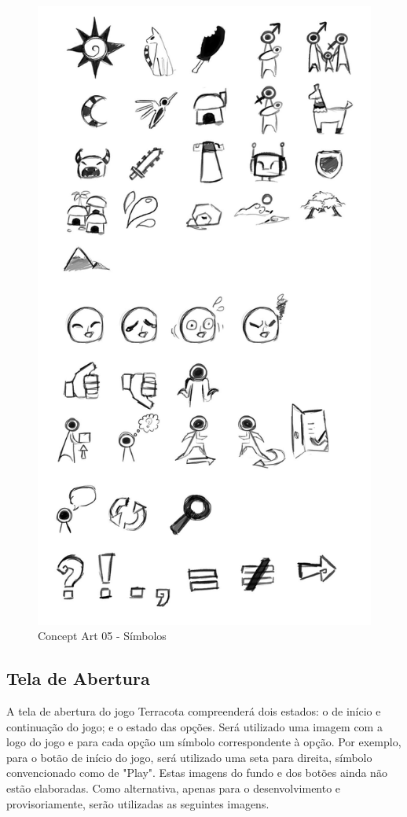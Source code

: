 \documentclass[12pt]{article}
\begin{document}
\begin{figure}[hp]
    \centering
    \includegraphics[scale=0.16]{concept_art_05.jpg}
    \caption{Concept Art 05 - Símbolos}
    \label{fig:concept_art_05}
\end{figure}

\newpage
\subsection{Tela de Abertura}
A tela de abertura do jogo Terracota compreenderá dois estados: o de início e
continuação do jogo; e o estado das opções. Será utilizado uma imagem com a
logo do jogo e para cada opção um símbolo correspondente à opção. Por exemplo,
para o botão de início do jogo, será utilizado uma seta para direita, símbolo
convencionado como de "Play". Estas imagens do fundo e dos botões ainda não
estão elaboradas. Como alternativa, apenas para o desenvolvimento e provisoriamente,
serão utilizadas as seguintes imagens.
\end{document}
